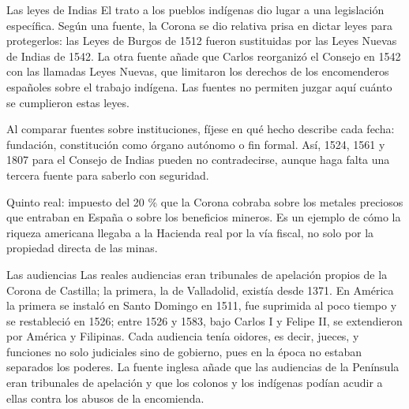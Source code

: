 \documentclass{book}
\begin{document}
\begin{tcolorbox}[title={Consejo}, studiumtip, breakable]

Las leyes de Indias
El trato a los pueblos indígenas dio lugar a una legislación específica. Según una fuente, la Corona se dio relativa prisa en dictar leyes para protegerlos: las Leyes de Burgos de 1512 fueron sustituidas por las Leyes Nuevas de Indias de 1542. La otra fuente añade que Carlos reorganizó el Consejo en 1542 con las llamadas Leyes Nuevas, que limitaron los derechos de los encomenderos españoles sobre el trabajo indígena. Las fuentes no permiten juzgar aquí cuánto se cumplieron estas leyes.


Al comparar fuentes sobre instituciones, fíjese en qué hecho describe cada fecha: fundación, constitución como órgano autónomo o fin formal. Así, 1524, 1561 y 1807 para el Consejo de Indias pueden no contradecirse, aunque haga falta una tercera fuente para saberlo con seguridad.

\end{tcolorbox}

\begin{tcolorbox}[title={Definición}, studiumdef, breakable]

Quinto real: impuesto del 20 \% que la Corona cobraba sobre los metales preciosos que entraban en España o sobre los beneficios mineros. Es un ejemplo de cómo la riqueza americana llegaba a la Hacienda real por la vía fiscal, no solo por la propiedad directa de las minas.

\end{tcolorbox}

\begin{tcolorbox}[title={Definición}, studiumdef, breakable]

Las audiencias
Las reales audiencias eran tribunales de apelación propios de la Corona de Castilla; la primera, la de Valladolid, existía desde 1371. En América la primera se instaló en Santo Domingo en 1511, fue suprimida al poco tiempo y se restableció en 1526; entre 1526 y 1583, bajo Carlos I y Felipe II, se extendieron por América y Filipinas. Cada audiencia tenía oidores, es decir, jueces, y funciones no solo judiciales sino de gobierno, pues en la época no estaban separados los poderes. La fuente inglesa añade que las audiencias de la Península eran tribunales de apelación y que los colonos y los indígenas podían acudir a ellas contra los abusos de la encomienda.

\end{tcolorbox}
\end{document}
